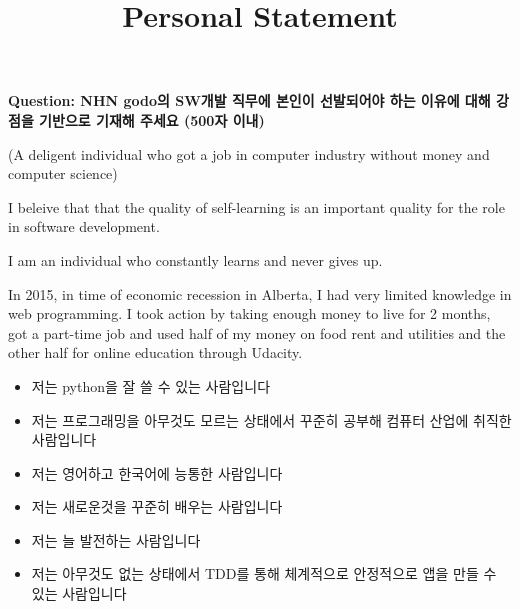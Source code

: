 \documentclass[12pt]{article}
\begin{document}
\title{Personal Statement}
\maketitle

\textbf{Question: NHN godo의 SW개발 직무에 본인이 선발되어야 하는 이유에 대해 강점을 기반으로 기재해 주세요 (500자 이내)}

\bigskip

(A deligent individual who got a job in computer industry without money and computer science)

I beleive that that the quality of self-learning is an important quality for the role in software development.

\bigskip

I am an individual who constantly learns and never gives up.

\bigskip

In 2015, in time of economic recession in Alberta, I had very limited knowledge in
web programming. I took action by taking enough money to live for 2 months, got a part-time job
and used half of my money on food rent and utilities and the other half for online education
through Udacity.


\begin{itemize}
    \item 저는 python을 잘 쓸 수 있는 사람입니다
    \item 저는 프로그래밍을 아무것도 모르는 상태에서 꾸준히 공부해 컴퓨터 산업에 취직한 사람입니다
    \item 저는 영어하고 한국어에 능통한 사람입니다
    \item 저는 새로운것을 꾸준히 배우는 사람입니다
    \item 저는 늘 발전하는 사람입니다
    \item 저는 아무것도 없는 상태에서 TDD를 통해 체계적으로 안정적으로 앱을 만들 수 있는 사람입니다
\end{itemize}
\end{document}
